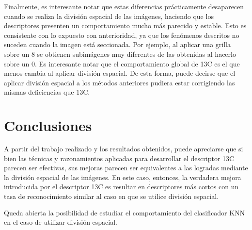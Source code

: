 \documentclass[12pt]{article}
\begin{document}
Finalmente, es interesante notar que estas diferencias prácticamente desaparecen
cuando se realiza la división espacial de las imágenes, haciendo que los
descriptores presenten un comportamiento mucho más parecido y estable. Esto es
consistente con lo expuesto con anterioridad, ya que los fenómenos descritos no
suceden cuando la imagen está seccionada. Por ejemplo, al aplicar una grilla
sobre un 8 se obtienen subimágenes muy diferentes de las obtenidas al hacerlo
sobre un 0. Es interesante notar que el comportamiento global de 13C es el que
menos cambia al aplicar división espacial. De esta forma, puede decirse que el
aplicar división espacial a los métodos anteriores pudiera estar corrigiendo las
mismas deficiencias que 13C.

\section{Conclusiones}

A partir del trabajo realizado y los resultados obtenidos, puede apreciarse que
si bien las técnicas y razonamientos aplicadas para desarrollar el descriptor
13C parecen ser efectivas, sus mejoras parecen ser equivalentes a las logradas
mediante la división espacial de las imágenes. En este caso, entonces, la
verdadera mejora introducida por el descriptor 13C es resultar en descriptores
más cortos con un tasa de reconocimiento similar al caso en que se utilice
división espacial.

Queda abierta la posibilidad de estudiar el comportamiento del clasificador KNN
en el caso de utilizar división espacial.





\end{document}
